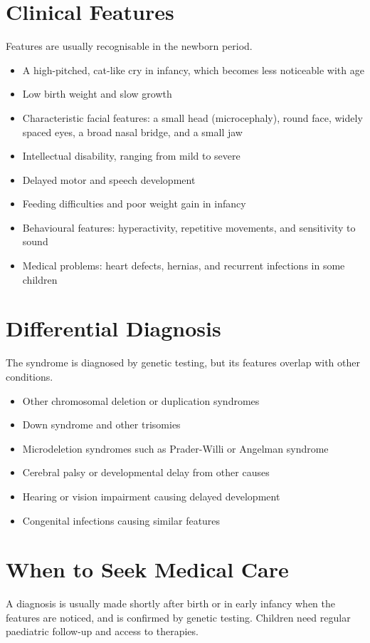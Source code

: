 \section*{Clinical Features}
Features are usually recognisable in the newborn period.

\begin{itemize}
    \item A high-pitched, cat-like cry in infancy, which becomes less noticeable with age
    \item Low birth weight and slow growth
    \item Characteristic facial features: a small head (microcephaly), round face, widely spaced eyes, a broad nasal bridge, and a small jaw
    \item Intellectual disability, ranging from mild to severe
    \item Delayed motor and speech development
    \item Feeding difficulties and poor weight gain in infancy
    \item Behavioural features: hyperactivity, repetitive movements, and sensitivity to sound
    \item Medical problems: heart defects, hernias, and recurrent infections in some children
\end{itemize}

\section*{Differential Diagnosis}
The syndrome is diagnosed by genetic testing, but its features overlap with other conditions.

\begin{itemize}
    \item Other chromosomal deletion or duplication syndromes
    \item Down syndrome and other trisomies
    \item Microdeletion syndromes such as Prader-Willi or Angelman syndrome
    \item Cerebral palsy or developmental delay from other causes
    \item Hearing or vision impairment causing delayed development
    \item Congenital infections causing similar features
\end{itemize}

\section*{When to Seek Medical Care}
A diagnosis is usually made shortly after birth or in early infancy when the features are noticed, and is confirmed by genetic testing. Children need regular paediatric follow-up and access to therapies.

